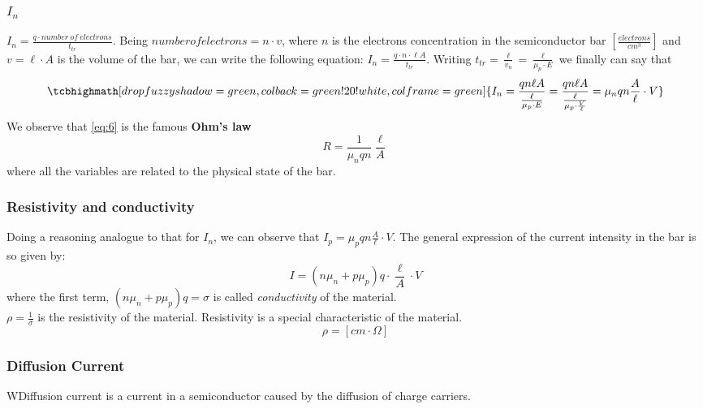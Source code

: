\documentclass[12pt]{article}
\newcommand{\B}{\textbf}
\newcommand{\I}{\textit}
\begin{document}
\subsubsection{$I_n$}
$I_n = \frac{q \cdot number \ of \ electrons}{t_{tr}}$. Being $number of electrons = n \cdot v$, where $n$ is the electrons concentration in the semiconductor bar $[\frac{electrons}{cm^3}]$ and $v= \ell \cdot A$ is the volume of the bar, we can write the following equation: $I_n = \frac{q \cdot n \cdot \ell A}{t_{tr}}$. Writing $t_{tr} = \frac{\ell}{v_n} = \frac{\ell}{\mu_p \cdot E}$ we finally can say that
\begin{equation} \label{eq:6}
\tcbhighmath[drop fuzzy shadow = green, colback = green!20!white, colframe = green]{
	I_n = \frac{q n \ell A}{\frac{\ell}{\mu_p \cdot E}} = \frac{q n \ell A}{\frac{\ell}{\mu_p \cdot \frac{V}{\ell}}}= \mu_n qn\frac{A}{\ell}\cdot V}
\end{equation}
We observe that \ref{eq:6} is the famous \B{Ohm's law} 
\begin{equation}
	R = \frac{1}{\mu_n q n}\frac{\ell}{A}
\end{equation}
where all the variables are related to the physical state of the bar.
\subsubsection{Resistivity and conductivity}
Doing a reasoning analogue to that for $I_n$, we can observe that $I_p = \mu_p qn\frac{A}{\ell}\cdot V$. The general expression of the current intensity in the bar is so given by:
\begin{equation}
	I = (n\mu_n+p\mu_p)q\cdot \frac{\ell}{A} \cdot V
\end{equation}
where the first term, $(n\mu_n+p\mu_p)q = \sigma $ is called \I{conductivity} of the material.\\
$\rho = \frac{1}{\sigma}$ is the resistivity of the material. 
Resistivity is a special characteristic of the material. 
\begin{equation}
	\rho = [cm \cdot \Omega]
\end{equation}

\subsubsection{Diffusion Current} 
WDiffusion current is a current in a semiconductor caused by the diffusion of charge carriers. 
\end{document}
